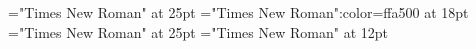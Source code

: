 \font\entryletHeaddiv="Times New Roman" at 25pt
\font{}="Times New Roman":color=ffa500 at 18pt
\font{}="Times New Roman" at 25pt
\font\div="Times New Roman" at 12pt


\bye
